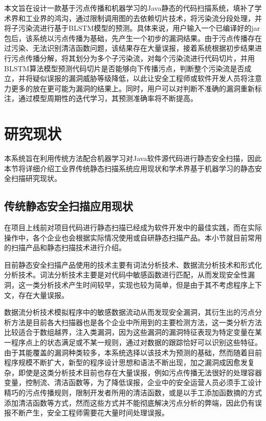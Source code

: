 本文旨在设计一款基于污点传播和机器学习的Java静态的代码扫描系统，填补了学术界和工业界的鸿沟，通过限制调用图的去依赖切片技术，将污染流分段处理，并将子污染流进行基于BLSTM模型的预测。具体来说，用户输入一个已编译好的jar包后，该系统以污点传播为基础，先产生一个初步的漏洞结果。由于污点传播存在过污染、无法识别清洁函数问题，该结果存在大量误报，接着系统根据初步结果进行污点传播分解，将其划分为多个子污染流，对每个污染流进行代码切片，并用BLSTM算法模型预测代码切片是否能够向下传播污点，判断整个污染流是否成立，并将疑似误报的漏洞威胁等级降低，以此让安全工程师或软件开发人员将注意力更多的放在更可能为漏洞的结果上。同时，用户可以对判断不准确的漏洞重新标注，通过模型周期性的迭代学习，其预测准确率将不断提高。

\section{研究现状}
本系统旨在利用传统方法配合机器学习对Java软件源代码进行静态安全扫描，因此本节将详细介绍工业界传统静态扫描系统应用现状和学术界基于机器学习的静态安全扫描研究现状。\\

\subsection{传统静态安全扫描应用现状}

在项目上线前对项目代码进行静态扫描已经成为软件开发中的最佳实践，而在实际操作中，各个企业也会根据实际情况使用或自研静态扫描产品。本小节就目前常用的扫描产品和静态扫描技术进行介绍。

目前静态安全扫描产品使用的技术主要有词法分析技术、数据流分析技术和形式化分析技术。词法分析技术主要是对代码中敏感函数进行匹配，从而发现安全性漏洞，这一类分析技术产生时间较早，实现也较为简单，但是由于其不考虑程序上下文，存在大量误报。

数据流分析技术模拟程序中的敏感数据流动从而发现安全漏洞，其衍生出的污点分析方法是目前各大扫描器也是各个企业中所用到的主要检测方法，这一类分析方法比较适合于数组越界，注入类漏洞，因为这些漏洞的漏洞特征表现为特定变量在某一程序点上的状态满足或不某一规则，通过对数据的跟踪恰好可以识别这些特征。由于其能覆盖的漏洞种类较多，本系统选择以该技术为预测的基础，然而随着目前程序规模不断扩大，新型的程序设计思想和语法不断出现，加之漏洞成因愈发复杂，即使是这类分析技术目前也存在大量误报，例如污点传播无法很好的处理容器变量，控制流、清洁函数等，为了降低误报，企业中的安全运营人员必须手工设计精巧的污点传播规则，限制开发者所用的清洁函数，或是以手工添加函数摘的方式添加清洁函数等方式，然而这些方式并不能彻底解决污点分析的弊端，因此仍有误报不断产生，安全工程师需要花大量时间处理误报。

